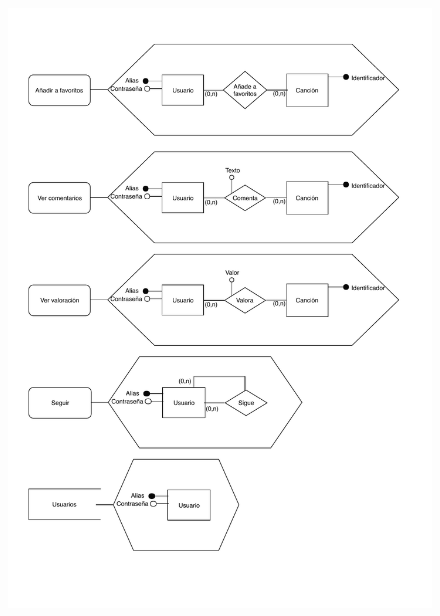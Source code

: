 \begin{figure}[H]
  \centering
  \includegraphics[scale=0.85]{diagramas/Esq-ext-social(1).pdf}
\end{figure}

